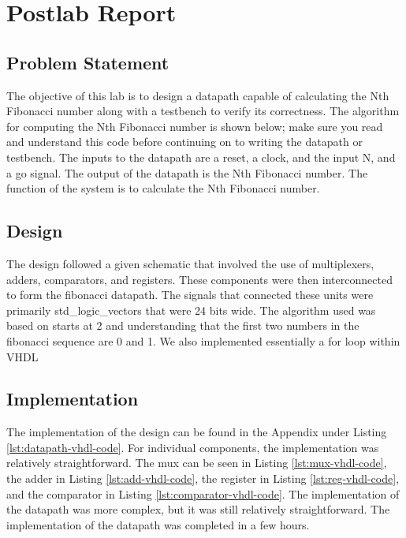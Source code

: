 \documentclass{article}
\begin{document}
\section*{Postlab Report}

\subsection*{Problem Statement}
The objective of this lab is to design a datapath capable of calculating the Nth Fibonacci
number along with a testbench to verify its correctness. The algorithm for computing the
Nth Fibonacci number is shown below; make sure you read and understand this code
before continuing on to writing the datapath or testbench. The inputs to the datapath are a reset, a clock, and the input N, and a go signal. The output of the datapath is the Nth Fibonacci number. The function of the system is to calculate the Nth Fibonacci number.

\subsection*{Design}
The design followed a given schematic that involved the use of multiplexers, adders, comparators, and registers. These components were then interconnected to form the fibonacci datapath. The signals that connected these units were primarily std\_logic\_vectors that were 24 bits wide. The algorithm used was based on starts at 2 and understanding that the first two numbers in the fibonacci sequence are 0 and 1. We also implemented essentially a for loop within VHDL 

\subsection*{Implementation}
The implementation of the design can be found in the Appendix under Listing \ref{lst:datapath-vhdl-code}. For individual components, the implementation was relatively straightforward. The mux can be seen in Listing \ref{lst:mux-vhdl-code}, the adder in Listing \ref{lst:add-vhdl-code}, the register in Listing \ref{lst:reg-vhdl-code}, and the comparator in Listing \ref{lst:comparator-vhdl-code}. The implementation of the datapath was more complex, but it was still relatively straightforward. The implementation of the datapath was completed in a few hours. 
\end{document}
